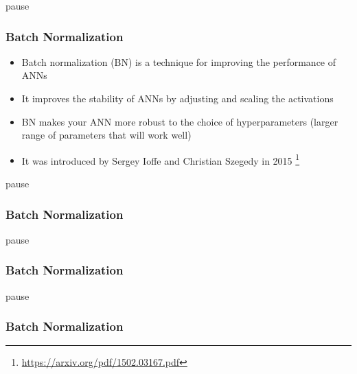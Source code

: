 \begin{frame}[fragile]{pause}\frametitle{Batch Normalization}
\begin{itemize}
\item Batch normalization (BN) is a technique for improving the performance of ANNs
\item It improves the stability of ANNs by adjusting and scaling the activations
\item BN makes your ANN more robust to the choice of hyperparameters (larger range of parameters that will work well)
\item It was introduced by Sergey Ioffe and Christian Szegedy in 2015 \footnote{\url{https://arxiv.org/pdf/1502.03167.pdf}}
\end{itemize}
\end{frame}

\begin{frame}[fragile]{pause}\frametitle{Batch Normalization}
\end{frame}

\begin{frame}[fragile]{pause}\frametitle{Batch Normalization}
\end{frame}

\begin{frame}[fragile]{pause}\frametitle{Batch Normalization}
\end{frame}

